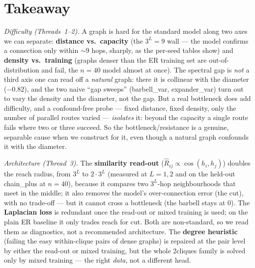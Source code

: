 \documentclass[11pt,a4paper]{article}
\begin{document}
\section{Takeaway}

\emph{Difficulty (Threads~1--2).} A graph is hard for the standard model along two axes we can
separate: \textbf{distance vs.\ capacity} (the $3^L=9$ wall --- the model confirms a connection
only within $\sim9$ hops, sharply, as the per-seed tables show) and \textbf{density vs.\ training}
(graphs denser than the ER training set are out-of-distribution and fail, the $n=40$ model almost
at once). The spectral gap is \emph{not} a third axis one can read off a \emph{natural} graph:
there it is collinear with the diameter ($-0.82$), and the two naive ``gap sweeps''
(barbell\_var, expander\_var) turn out to vary the density and the diameter, not the gap. But a
real bottleneck does add difficulty, and a confound-free probe --- fixed distance, fixed density,
only the number of parallel routes varied --- \emph{isolates} it: beyond the capacity a single
route fails where two or three succeed. So the bottleneck/resistance is a genuine, separable cause
when we construct for it, even though a natural graph confounds it with the diameter.

\emph{Architecture (Thread~3).} The \textbf{similarity read-out} ($\hat R_{ij}\propto\cos(h_i,h_j)$)
doubles the reach radius, from $3^L$ to $2\cdot3^L$ (measured at $L=1,2$ and on the held-out
chain\_plus at $n=40$), because it compares two $3^L$-hop neighbourhoods that meet in the middle;
it also removes the model's over-connection error (the cut), with no trade-off --- but it cannot
cross a bottleneck (the barbell stays at $0$). The \textbf{Laplacian loss} is redundant once the
read-out or mixed training is used; on the plain ER baseline it only trades reach for cut. Both
are non-standard, so we read them as diagnostics, not a recommended architecture. The
\textbf{degree heuristic} (failing the easy within-clique pairs of dense graphs) is repaired at
the pair level by either the read-out or mixed training, but the whole 2cliques family is solved
only by mixed training --- the right \emph{data}, not a different head.
\end{document}
